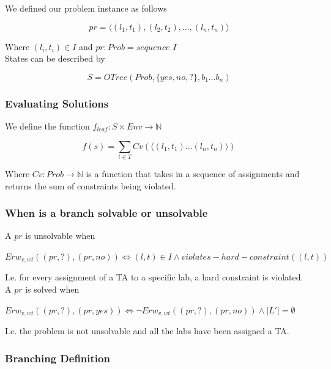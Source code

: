 \documentclass{article}
\begin{document}
We defined our problem instance as follows

\[
pr = \langle (l_1, t_1), (l_2, t_2), ..., (l_n, t_n)  \rangle
\]

Where $(l_i, t_i) \in I$ and $pr : Prob = sequence$ $I$\\

States can be described by

\[
S = OTree(Prob, \{yes, no, ?\}, b_1 ... b_n)
\]

\subsubsection{Evaluating Solutions}

We define the function $f_{leaf} : S \times Env \rightarrow \mathbb{N}$

\[
f(s) = \sum_{t \in T} Cv(\langle (l_1, t_1) ... (l_n, t_n) \rangle)
\]

Where $Cv: Prob \rightarrow \mathbb{N}$ is a function that takes in a
sequence of assignments and returns the sum of constraints being violated.

\subsubsection{When is a branch solvable or unsolvable}

A $pr$ is unsolvable when

\begin{center}
$Erw_{v,wt}((pr, ?),(pr, no)) \iff (l, t) \in I \land violates-hard-constraint((l,t))$
\end{center}

I.e. for every assignment of a TA to a specific lab, a hard constraint
is violated.\\

A $pr$ is solved when\\

\begin{center}
  $Erw_{v,wt}((pr, ?),(pr, yes)) \iff \lnot Erw_{v,wt}((pr, ?),(pr,
  no)) \land |L'| = \emptyset$

\end{center}

I.e. the problem is not unsolvable and all the labs have been assigned
a TA.

\subsubsection{Branching Definition}
\end{document}

